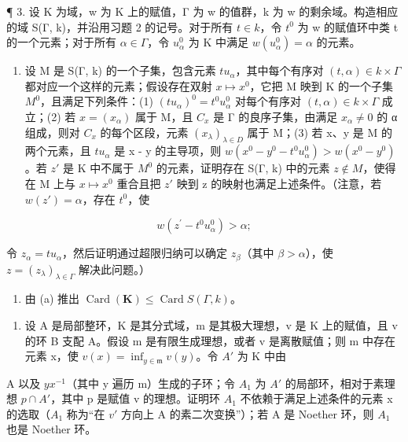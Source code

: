 ¶ 3. 设 K 为域，w 为 K 上的赋值，Γ 为 w 的值群，k 为 w 的剩余域。构造相应的域 S(Γ, k)，并沿用习题 2 的记号。对于所有 \(t \in k\)，令 \(t^{0}\) 为 w 的赋值环中类 t 的一个元素；对于所有 \(\alpha \in \Gamma\)，令 \(u_{\alpha}^{0}\) 为 K 中满足 \(w(u_{\alpha}^{0}) = \alpha\) 的元素。

\begin{enumerate}
\def\labelenumi{(\alph{enumi})}
\tightlist
\item
  设 M 是 S(Γ, k) 的一个子集，包含元素 \(tu_{\alpha}\)，其中每个有序对 \((t, \alpha) \in k \times \Gamma\) 都对应一个这样的元素；假设存在双射 \(x \mapsto x^{0}\)，它把 M 映到 K 的一个子集 \(M^{0}\)，且满足下列条件：(1) \((tu_{\alpha})^{0} = t^{0}u_{\alpha}^{0}\) 对每个有序对 \((t, \alpha) \in k \times \Gamma\) 成立；(2) 若 \(x = (x_{\alpha})\) 属于 M，且 \(C_{x}\) 是 Γ 的良序子集，由满足 \(x_{\alpha} \neq 0\) 的 α 组成，则对 \(C_{x}\) 的每个区段，元素 \((x_{\lambda})_{\lambda \in D}\) 属于 M；(3) 若 x、y 是 M 的两个元素，且 \(tu_{\alpha}\) 是 x - y 的主导项，则 \(w(x^{0} - y^{0} - t^{0}u_{\alpha}^{0}) > w(x^{0} - y^{0})\)。若 \(z'\) 是 K 中不属于 \(M^{0}\) 的元素，证明存在 S(Γ, k) 中的元素 \(z \notin M\)，使得在 M 上与 \(x \mapsto x^{0}\) 重合且把 \(z'\) 映到 z 的映射也满足上述条件。（注意，若 \(w(z') = \alpha\)，存在 \(t^{0}\)，使
\end{enumerate}

\[
w (z ^ {\prime} - t ^ {0} u _ {\alpha} ^ {0}) > \alpha ;
\]

令 \(z_{\alpha} = tu_{\alpha}\)，然后证明通过超限归纳可以确定 \(z_{\beta}\)（其中 \(\beta > \alpha\)），使 \(z = (z_{\lambda})_{\lambda \in \Gamma}\) 解决此问题。）

\begin{enumerate}
\def\labelenumi{(\alph{enumi})}
\setcounter{enumi}{1}
\tightlist
\item
  由 (a) 推出 \(\operatorname{Card}(\mathbf{K}) \leqslant \operatorname{Card} S(\Gamma, k)\)。
\end{enumerate}

\begin{enumerate}
\def\labelenumi{\arabic{enumi}.}
\setcounter{enumi}{3}
\tightlist
\item
  设 A 是局部整环，K 是其分式域，m 是其极大理想，v 是 K 上的赋值，且 v 的环 B 支配 A。假设 m 是有限生成理想，或者 v 是离散赋值；则 m 中存在元素 x，使 \(v(x) = \inf_{y \in \mathfrak{m}} v(y)\)。令 \(A'\) 为 K 中由
\end{enumerate}

A 以及 \(yx^{-1}\)（其中 y 遍历 m）生成的子环；令 \(A_{1}\) 为 \(A'\) 的局部环，相对于素理想 \(p \cap A'\)，其中 p 是赋值 v 的理想。证明环 \(A_{1}\) 不依赖于满足上述条件的元素 x 的选取（\(A_{1}\) 称为“在 \(v'\) 方向上 A 的素二次变换”）；若 A 是 Noether 环，则 \(A_{1}\) 也是 Noether 环。

